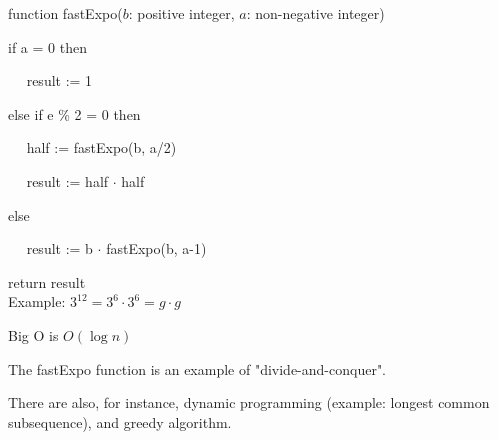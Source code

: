 \documentclass{exam}
\begin{document}
    \noindent
    function fastExpo($b$: positive integer, $a$: non-negative integer)
    
    if a = 0 then
    
    $\quad$ result := 1
    
    else if e \% 2 = 0 then
    
    $\quad$ half := fastExpo(b, a/2)
    
    $\quad$ result := half $\cdot$ half
    
    else
    
    $\quad$ result := b $\cdot$ fastExpo(b, a-1)
    
    return result\\
    
    Example: $3^{12} = 3^6 \cdot 3^6 = g \cdot g$
    
    Big O is $O(\log n)$
    
    The fastExpo function is an example of "divide-and-conquer".
    
    There are also, for instance, dynamic programming (example: longest common subsequence), and greedy algorithm.
    
    
    
\end{document}

